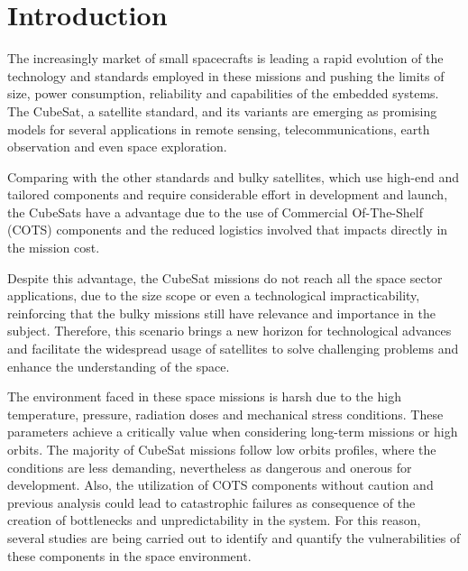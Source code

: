 %
%
%
%
%

%
%
%
%
%
\newpage

\section{Introduction} \label{sec:introduction}

The increasingly market of small spacecrafts \cite{small_spacecraft_state_of_art} is leading a rapid evolution of the technology and standards employed in these missions and pushing the limits of size, power consumption, reliability and capabilities of the embedded systems. The CubeSat, a satellite standard, and its variants are emerging as promising models for several applications in remote sensing, telecommunications, earth observation and even space exploration. 

Comparing with the other standards and bulky satellites, which use high-end and tailored components and require considerable effort in development and launch, the CubeSats have a advantage due to the use of Commercial Of-The-Shelf (COTS) components and the reduced logistics involved that impacts directly in the mission cost. 

Despite this advantage, the CubeSat missions do not reach all the space sector applications, due to the size scope or even a technological impracticability, reinforcing that the bulky missions still have relevance and importance in the subject. Therefore, this scenario brings a new horizon for technological advances and facilitate the widespread usage of satellites to solve challenging problems and enhance the understanding of the space.

The environment faced in these space missions is harsh due to the high temperature, pressure, radiation doses and mechanical stress conditions. These parameters achieve a critically value when considering long-term missions or high orbits. The majority of CubeSat missions follow low orbits profiles, where the conditions are less demanding, nevertheless as dangerous and onerous for development. Also, the utilization of COTS components without caution and previous analysis could lead to catastrophic failures as consequence of the creation of bottlenecks and unpredictability in the system. For this reason, several studies are being carried out to identify and quantify the vulnerabilities of these components in the space environment.

